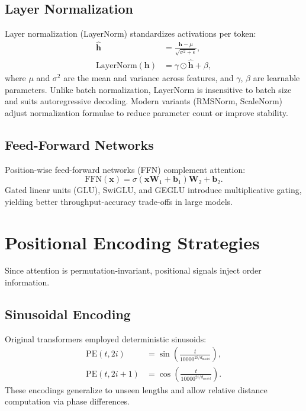 \documentclass{article}
\begin{document}
\subsection{Layer Normalization}
Layer normalization (LayerNorm) standardizes activations per token:
\begin{align}
  \hat{\mathbf{h}} &= \frac{\mathbf{h} - \mu}{\sqrt{\sigma^2 + \epsilon}}, \\
  \mathrm{LayerNorm}(\mathbf{h}) &= \gamma \odot \hat{\mathbf{h}} + \beta,
\end{align}
where $\mu$ and $\sigma^2$ are the mean and variance across features, and $\gamma$, $\beta$ are learnable parameters. Unlike batch normalization, LayerNorm is insensitive to batch size and suits autoregressive decoding. Modern variants (RMSNorm, ScaleNorm) adjust normalization formulae to reduce parameter count or improve stability.

\subsection{Feed-Forward Networks}
Position-wise feed-forward networks (FFN) complement attention:
\begin{equation}
  \mathrm{FFN}(\mathbf{x}) = \sigma(\mathbf{x}\mathbf{W}_1 + \mathbf{b}_1) \mathbf{W}_2 + \mathbf{b}_2.
\end{equation}
Gated linear units (GLU), SwiGLU, and GEGLU introduce multiplicative gating, yielding better throughput-accuracy trade-offs in large models.

\section{Positional Encoding Strategies}
Since attention is permutation-invariant, positional signals inject order information.

\subsection{Sinusoidal Encoding}
Original transformers employed deterministic sinusoids:
\begin{align}
  \mathrm{PE}(t, 2i) &= \sin\left(\frac{t}{10000^{2i/d_{\text{model}}}}\right), \\
  \mathrm{PE}(t, 2i+1) &= \cos\left(\frac{t}{10000^{2i/d_{\text{model}}}}\right).
\end{align}
These encodings generalize to unseen lengths and allow relative distance computation via phase differences.
\end{document}

